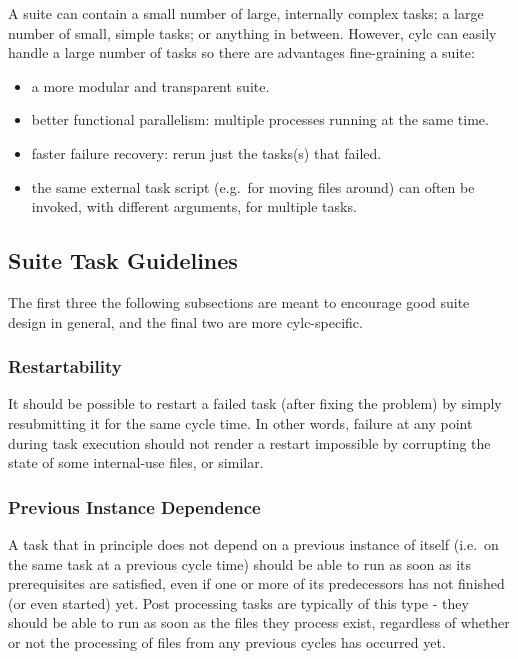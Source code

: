 \documentclass[11pt,a4paper]{article}
\begin{document}
A suite can contain a small number of large, internally complex tasks;
a large number of small, simple tasks; or anything in between. However,
cylc can easily handle a large number of tasks so there are advantages
fine-graining a suite:

\begin{itemize}
    \item a more modular and transparent suite.

    \item better functional parallelism: multiple processes running
        at the same time.

    \item faster failure recovery: rerun just the tasks(s) that failed. 

    \item the same external task script (e.g.\ for moving files around)
        can often be invoked, with different arguments, for multiple
        tasks.

\end{itemize}

\subsection{Suite Task Guidelines} 
\label{SuiteTaskGuidelines}

The first three the following subsections are meant to encourage good
suite design in general, and the final two are more cylc-specific.

\subsubsection{Restartability}

It should be possible to restart a failed task (after fixing the
problem) by simply resubmitting it for the same cycle time. In other
words, failure at any point during task execution should not render a
restart impossible by corrupting the state of some internal-use files,
or similar. 

\subsubsection{Previous Instance Dependence} 

A task that in principle does not depend on a previous instance of
itself (i.e.\ on the same task at a previous cycle time) should be able
to run as soon as its prerequisites are satisfied, even if one or more
of its predecessors has not finished (or even started) yet.  Post
processing tasks are typically of this type - they should be able to run
as soon as the files they process exist, regardless of whether or not
the processing of files from any previous cycles has occurred yet.
\end{document}
